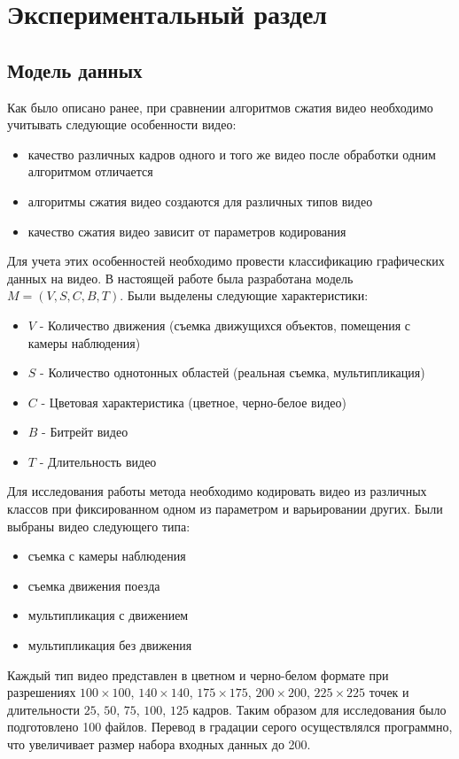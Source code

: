 \chapter{Экспериментальный раздел}
\label{cha:research}

\section{Модель данных}
Как было описано ранее, при сравнении алгоритмов сжатия видео необходимо учитывать следующие особенности видео:
\begin{itemize}
\item качество различных кадров одного и того же видео после обработки одним алгоритмом отличается
\item алгоритмы сжатия видео создаются для различных типов видео
\item качество сжатия видео зависит от параметров кодирования
\end{itemize}

Для учета этих особенностей необходимо провести классификацию графических данных на видео.
В настоящей работе была разработана модель $M = (V, S, C, B, T)$.
Были выделены следующие характеристики:
\begin{itemize}
\item $V$ - Количество движения (съемка движущихся объектов, помещения с камеры наблюдения)
\item $S$ - Количество однотонных областей (реальная съемка, мультипликация)
\item $C$ - Цветовая характеристика (цветное, черно-белое видео)
\item $B$ - Битрейт видео
\item $T$ - Длительность видео
\end{itemize}

Для исследования работы метода необходимо кодировать видео из различных классов при фиксированном одном из параметром и варьировании других.
Были выбраны видео следующего типа:
\begin{itemize}
\item съемка с камеры наблюдения
\item съемка движения поезда
\item мультипликация с движением
\item мультипликация без движения
\end{itemize}

Каждый тип видео представлен в цветном и черно-белом формате при разрешениях $100 \times 100$, $140 \times 140$, $175 \times 175$, $200 \times 200$, $225 \times 225$ 
точек и длительности $25$, $50$, $75$, $100$, $125$ кадров. Таким образом для исследования было подготовлено 100 файлов. 
Перевод в градации серого осуществлялся программно, что увеличивает размер набора входных данных до 200.

